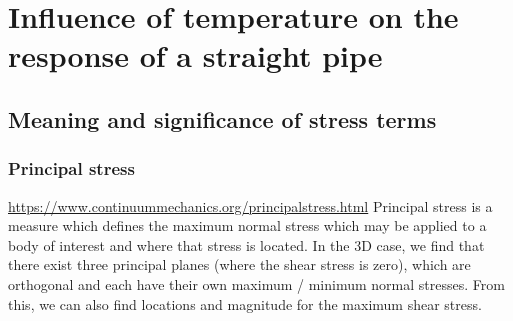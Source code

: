 \section{Influence of temperature on the response of a straight pipe}
\subsection{Meaning and significance of stress terms}
\subsubsection{Principal stress}
\url{https://www.continuummechanics.org/principalstress.html}
Principal stress is a measure which defines the maximum normal stress which may be applied to a body of interest and where that stress is located. %
In the 3D case, we find that there exist three principal planes (where the shear stress is zero), which are orthogonal and each have their own maximum / minimum normal stresses. From this, we can also find locations and magnitude for the maximum shear stress.

